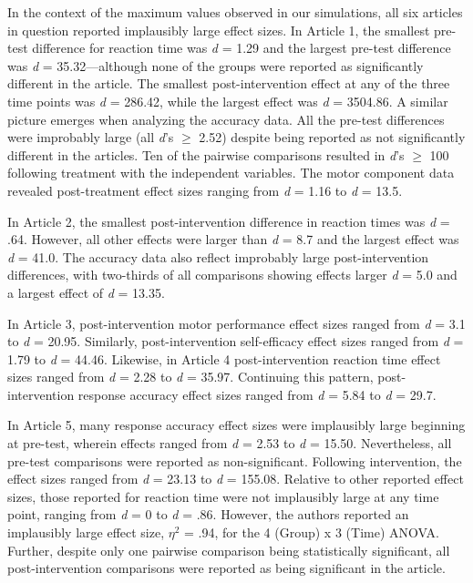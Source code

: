 \documentclass[
  english,
  man, donotrepeattitle,floatsintext]{apa7}
\begin{document}
In the context of the maximum values observed in our simulations, all six articles in question reported implausibly large effect sizes. In Article 1, the smallest pre-test difference for reaction time was \emph{d} = 1.29 and the largest pre-test difference was \emph{d} = 35.32---although none of the groups were reported as significantly different in the article. The smallest post-intervention effect at any of the three time points was \emph{d} = 286.42, while the largest effect was \emph{d} = 3504.86. A similar picture emerges when analyzing the accuracy data. All the pre-test differences were improbably large (all \emph{d}'s \(\geq\) 2.52) despite being reported as not significantly different in the articles. Ten of the pairwise comparisons resulted in \emph{d}'s \(\geq\) 100 following treatment with the independent variables. The motor component data revealed post-treatment effect sizes ranging from \emph{d} = 1.16 to \emph{d} = 13.5.

In Article 2, the smallest post-intervention difference in reaction times was \emph{d} = .64. However, all other effects were larger than \emph{d} = 8.7 and the largest effect was \emph{d} = 41.0. The accuracy data also reflect improbably large post-intervention differences, with two-thirds of all comparisons showing effects larger \emph{d} = 5.0 and a largest effect of \emph{d} = 13.35.

In Article 3, post-intervention motor performance effect sizes ranged from \emph{d} = 3.1 to \emph{d} = 20.95. Similarly, post-intervention self-efficacy effect sizes ranged from \emph{d} = 1.79 to \emph{d} = 44.46. Likewise, in Article 4 post-intervention reaction time effect sizes ranged from \emph{d} = 2.28 to \emph{d} = 35.97. Continuing this pattern, post-intervention response accuracy effect sizes ranged from \emph{d} = 5.84 to \emph{d} = 29.7.

In Article 5, many response accuracy effect sizes were implausibly large beginning at pre-test, wherein effects ranged from \emph{d} = 2.53 to \emph{d} = 15.50. Nevertheless, all pre-test comparisons were reported as non-significant. Following intervention, the effect sizes ranged from \emph{d} = 23.13 to \emph{d} = 155.08. Relative to other reported effect sizes, those reported for reaction time were not implausibly large at any time point, ranging from \emph{d} = 0 to \emph{d} = .86. However, the authors reported an implausibly large effect size, \(\eta^{2}\) = .94, for the 4 (Group) x 3 (Time) ANOVA. Further, despite only one pairwise comparison being statistically significant, all post-intervention comparisons were reported as being significant in the article.
\end{document}
